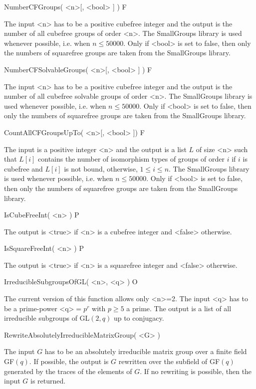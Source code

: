 \>NumberCFGroups( <n>[, <bool> ] ) F

The input <n> has to be a positive cubefree integer and the output is the number of all
cubefree groups of order <n>. The SmallGroups library  is used whenever
possible, i.e. when $n\leq 50000$. Only if <bool> is set to false, then only the numbers of
squarefree groups are taken from the SmallGroups library.


\>NumberCFSolvableGroups( <n>[, <bool> ] ) F 

The input <n> has to be a positive cubefree integer and the output is the number of all
cubefree solvable groups of order <n>. The SmallGroups library is used whenever
possible, i.e. when $n\leq 50000$. Only if <bool> is set to false, then only the numbers of
squarefree groups are taken from the SmallGroups library.


\>CountAllCFGroupsUpTo( <n>[, <bool> ]) F  

The input is a positive integer <n> and the output is a list $L$ of size <n> such that
$L[i]$ contains the number of isomorphism types of groups of order $i$ if $i$
is cubefree and $L[i]$ is not bound, otherwise, $1\leq i \leq n$. The SmallGroups library is used whenever
possible, i.e. when $n\leq 50000$. Only if <bool> is set to false, then only the numbers of
squarefree groups are taken from the SmallGroups library.


\>IsCubeFreeInt( <n> ) P

The output is <true> if <n> is a cubefree integer and <false> otherwise.


\>IsSquareFreeInt( <n> ) P

The output is <true> if <n> is a squarefree integer and <false> otherwise.

\>IrreducibleSubgroupsOfGL( <n>, <q> ) O

The current version of this function allows only <n>=2. The input <q> has to be a prime-power <q>$=p^r$ with $p\geq 5$ a prime. The output
is a list of all irreducible subgroups of GL$(2,q)$ up to conjugacy.

\>RewriteAbsolutelyIrreducibleMatrixGroup( <G> )

The input $G$ has to be an absolutely irreducible matrix group over a finite
field GF$(q)$. If possible, the output is
$G$ rewritten over the subfield of GF$(q)$ generated by the traces of the
elements of $G$. If no rewriting is possible, then the
input $G$ is returned. 



